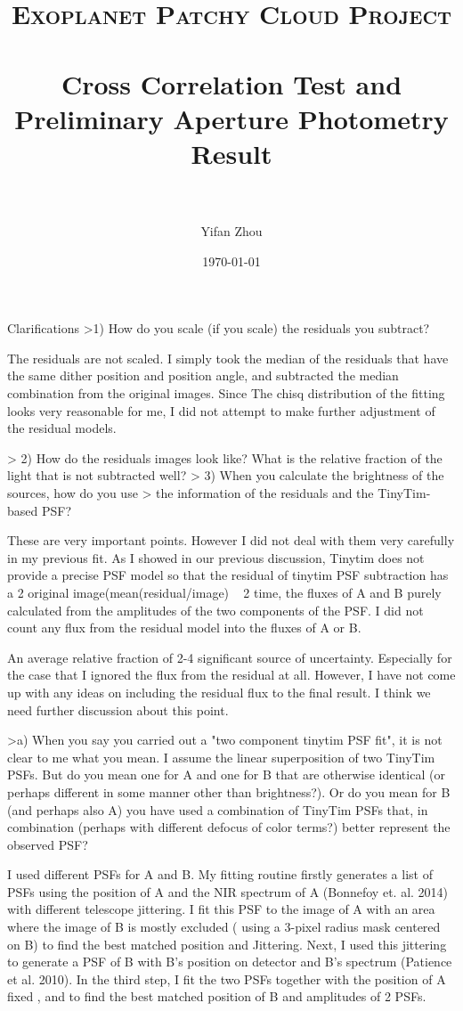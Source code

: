 \documentclass[paper=letter, fontsize=11pt]{scrartcl} %
\title{ 
\normalfont \normalsize 
\textsc{Exoplanet Patchy Cloud Project} \\ [25pt] %
\horrule{0.5pt} \\[0.4cm] %
\huge Cross Correlation Test and Preliminary Aperture Photometry Result\\ %
\horrule{2pt} \\[0.5cm] %
}
\author{Yifan Zhou} %
\date{\normalsize\today} %
\numberwithin{equation}{section} %
\numberwithin{figure}{section} %
\numberwithin{table}{section} %
\begin{document}
\maketitle %
Clarifications
>1) How do you scale (if you scale) the residuals you subtract?

The residuals are not scaled. I simply took the median of the
residuals that have the same dither position and position angle, and
subtracted the median combination from the original images. Since The
chisq distribution of the fitting looks very reasonable for me, I did
not attempt to make further adjustment of the residual models.

> 2) How do the residuals images look like? What is the relative fraction of the light that is not subtracted well?     
> 3) When you calculate the brightness of the sources, how do you use
> the information of the residuals and the TinyTim-based PSF?

These are very important points. However I did not deal with them very
carefully in my previous fit. As I showed in our previous discussion,
Tinytim does not provide a precise PSF model so that the residual of
tinytim PSF subtraction has a 2%
original image(mean(residual/image) ~ 2%
time,  the fluxes of A and B purely calculated from the
amplitudes of the two components of the PSF. I did not count any flux
from the residual model into the fluxes of A or B.

An average relative fraction of 2-4%
significant source of uncertainty. Especially for the case that I
ignored the flux from the residual at all. However, I have not come up
with any ideas on including the residual flux to the final result. I
think we need further discussion about this point.

>a) When you say you carried out a "two component tinytim PSF fit", it is not clear to me what you mean.  I assume the linear superposition of two TinyTim PSFs.  But do you mean one for A and one for B that are otherwise identical (or perhaps different in some manner other than brightness?).  Or do you mean for B (and perhaps also A) you have used a combination  of TinyTim PSFs that, in combination (perhaps with different defocus of color terms?) better represent the observed PSF?        

I used different PSFs for A and B. My fitting routine firstly
generates a list of PSFs using the position of A and the NIR spectrum
of A (Bonnefoy et. al. 2014) with different telescope jittering. I fit
this PSF to the image of A with an area where the image of B is mostly
excluded ( using a 3-pixel radius mask centered on B) to find the best
matched position and Jittering. Next, I used this jittering to
generate a PSF of B with B's position on detector and B's spectrum
(Patience et al. 2010). In the third step, I fit the two PSFs together
with the position of A fixed , and to find the best matched position
of B and amplitudes of 2 PSFs.
\end{document}
